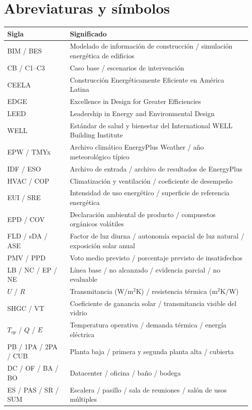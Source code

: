 \clearpage
\chapter*{Abreviaturas y símbolos}
{\small\singlespacing
\begin{longtable}{p{2.3cm}p{11cm}}\toprule
Sigla & Significado \\ \midrule
BIM / BES & Modelado de información de construcción / simulación energética de edificios \\
CB / C1--C3 & Caso base / escenarios de intervención \\
CEELA & Construcción Energéticamente Eficiente en América Latina \\
EDGE & Excellence in Design for Greater Efficiencies \\
LEED & Leadership in Energy and Environmental Design \\
WELL & Estándar de salud y bienestar del International WELL Building Institute \\
EPW / TMYx & Archivo climático EnergyPlus Weather / año meteorológico típico \\
IDF / ESO & Archivo de entrada / archivo de resultados de EnergyPlus \\
HVAC / COP & Climatización y ventilación / coeficiente de desempeño \\
EUI / SRE & Intensidad de uso energético / superficie de referencia energética \\
EPD / COV & Declaración ambiental de producto / compuestos orgánicos volátiles \\
FLD / sDA / ASE & Factor de luz diurna / autonomía espacial de luz natural / exposición solar anual \\
PMV / PPD & Voto medio previsto / porcentaje previsto de insatisfechos \\
LB / NC / EP / NE & Línea base / no alcanzado / evidencia parcial / no evaluable \\
$U$ / $R$ & Transmitancia (W/m$^2$K) / resistencia térmica (m$^2$K/W) \\
SHGC / VT & Coeficiente de ganancia solar / transmitancia visible del vidrio \\
$T_{op}$ / $Q$ / $E$ & Temperatura operativa / demanda térmica / energía eléctrica \\
PB / 1PA / 2PA / CUB & Planta baja / primera y segunda planta alta / cubierta \\
DC / OF / BA / BO & Datacenter / oficina / baño / bodega \\
ES / PAS / SR / SUM & Escalera / pasillo / sala de reuniones / salón de usos múltiples \\
\bottomrule\end{longtable}}
